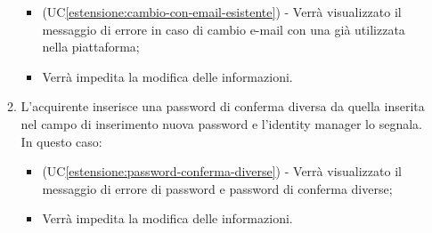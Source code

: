 \begin{itemize}
\begin{enumerate}[label=\lett]
\begin{itemize}
            \item (UC\ref{estensione:cambio-con-email-esistente}) - Verrà visualizzato il messaggio di errore in caso di cambio e-mail con una già utilizzata nella piattaforma;
            \item Verrà impedita la modifica delle informazioni.
        \end{itemize}
        \item L'acquirente inserisce una password di conferma diversa da quella inserita nel campo di inserimento nuova password e l'identity manager lo segnala. In questo caso:
        \begin{itemize}
            \item (UC\ref{estensione:password-conferma-diverse}) - Verrà visualizzato il messaggio di errore di password e password di conferma diverse;
            \item Verrà impedita la modifica delle informazioni.
        \end{itemize}
    \end{enumerate}
\end{itemize}

\label{modifica-informazioni-acquirente.nome}

